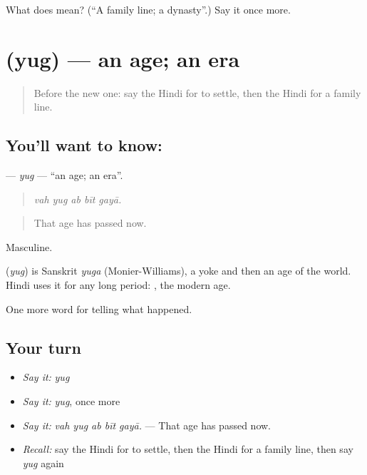 \begin{tcolorbox}[breakable,colback=teal!4,colframe=teal!35!black,title={Before you move on}]
What does  mean? (\textquotedblleft{}A family line; a dynasty\textquotedblright{}.) Say it once more.
\end{tcolorbox}
\section[\texorpdfstring{\hi{युग} (yug)}{युग (yug)}]{ (yug) — an age; an era}

\label{lesson:HI-C327-yug}



\begin{quote}
Before the new one: say the Hindi for to settle, then the Hindi for a family line.
\end{quote}

\subsection*{You'll want to know: }
\textbf{} — \emph{yug} — \textquotedblleft{}an age; an era\textquotedblright{}.

\begin{quote}
    
\end{quote}

\begin{quote}
\emph{vah yug ab bīt gayā.}
\end{quote}

\begin{quote}
That age has passed now.
\end{quote}

Masculine.

\begin{cousinweb}
\textbf{} (\emph{yug}) is Sanskrit \emph{yuga} (Monier-Williams), a yoke and then an age of the world. Hindi uses it for any long period: \textbf{ }, the modern age.
\end{cousinweb}

\begin{grammarlens}[title={What you've built}]
One more word for telling what happened.
\end{grammarlens}

\subsection*{Your turn}
\begin{itemize}
\raggedright
  \item \emph{Say it:} \emph{yug}
  \item \emph{Say it:} \emph{yug}, once more
  \item \emph{Say it:} \emph{vah yug ab bīt gayā.} — That age has passed now.
  \item \emph{Recall:} say the Hindi for to settle, then the Hindi for a family line, then say \emph{yug} again
\end{itemize}

